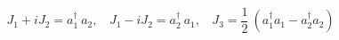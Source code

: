 \begin{equation}
J_1+iJ_2= a_1^\dag~a_2,~~~~J_1-iJ_2= a_2^\dag~a_1,~~~~J_3= \frac{1}{2}~(a_1^\dag a_1 -a_2^\dag a_2)
\end{equation}

